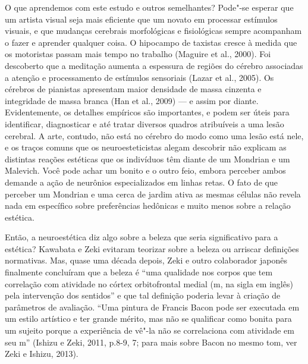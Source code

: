 O que aprendemos com este estudo e outros semelhantes? Pode"-se esperar
que um artista visual seja mais eficiente que um novato em processar
estímulos visuais, e que mudanças cerebrais morfológicas e fisiológicas
sempre acompanham o fazer e aprender qualquer coisa. O hipocampo de
taxistas cresce à medida que os motoristas passam mais tempo no trabalho
(Maguire et al., 2000). Foi descoberto que a meditação aumenta a
espessura de regiões do cérebro associadas a atenção e processamento de
estímulos sensoriais (Lazar et al., 2005). Os cérebros de pianistas
apresentam maior densidade de massa cinzenta e integridade de massa
branca (Han et al., 2009) --- e assim por diante. Evidentemente, os
detalhes empíricos são importantes, e podem ser úteis para identificar,
diagnosticar e até tratar diversos quadros atribuíveis a uma lesão
cerebral. A arte, contudo, não está no cérebro do modo como uma lesão
está nele, e os traços comuns que os neuroesteticistas alegam descobrir
não explicam as distintas reações estéticas que os indivíduos têm diante
de um Mondrian e um Malevich. Você pode achar um bonito e o outro feio,
embora perceber ambos demande a ação de neurônios especializados em
linhas retas. O fato de que perceber um Mondrian e uma cerca de jardim
ativa as mesmas células não revela nada em específico sobre preferências
hedônicas e muito menos sobre a relação estética.

Então, a neuroestética diz algo sobre a beleza que seria significativo
para a estética? Kawabata e Zeki evitaram teorizar sobre a beleza ou
arriscar definições normativas. Mas, quase uma década depois, Zeki e
outro colaborador japonês finalmente concluíram que a beleza é ``uma
qualidade nos corpos que tem correlação com atividade no córtex
orbitofrontal medial (m, na sigla em inglês) pela intervenção dos
sentidos'' e que tal definição poderia levar à criação de parâmetros de
avaliação. ``Uma pintura de Francis Bacon pode ser executada em um
estilo artístico e ter grande mérito, mas não se qualificar como bonita
para um sujeito porque a experiência de vê"-la não se correlaciona com
atividade em seu m'' (Ishizu e Zeki, 2011, p.8-9, 7; para mais sobre
Bacon no mesmo tom, ver Zeki e Ishizu, 2013).

